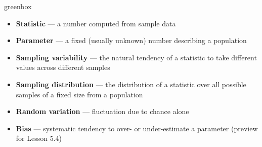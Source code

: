 \documentclass[10pt]{article}
\begin{document}
\begin{skillbox}{greenbox}
\begin{minipage}[t]{0.48\linewidth}
    \begin{itemize}
        \item \textbf{Statistic} --- a number computed from sample data
        \item \textbf{Parameter} --- a fixed (usually unknown) number describing a
              population
        \item \textbf{Sampling variability} --- the natural tendency of a statistic to
              take different values across different samples
    \end{itemize}
\end{minipage}
\hfill
\begin{minipage}[t]{0.48\linewidth}
    \begin{itemize}
        \item \textbf{Sampling distribution} --- the distribution of a statistic over
              all possible samples of a fixed size from a population
        \item \textbf{Random variation} --- fluctuation due to chance alone
        \item \textbf{Bias} --- systematic tendency to over- or under-estimate a
              parameter (preview for Lesson 5.4)
    \end{itemize}
\end{minipage}
\end{skillbox}
\end{document}
